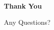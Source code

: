 \documentclass[t]{beamer}
\begin{document}
	\begin{darkframes}
		\begin{frame}{}
			\vspace*{.35\textheight}
			\begin{center}
				{\bf\LARGE Thank You}
				
				\vspace*{.5\baselineskip}
				
				{\Large Any Questions?}
			\end{center}
		\end{frame}
	\end{darkframes}
	
\end{document}
